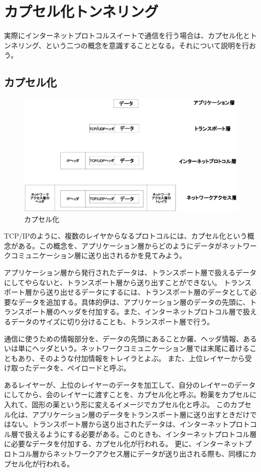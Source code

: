\section{カプセル化トンネリング}

実際にインターネットプロトコルスイートで通信を行う場合は、カプセル化とトンネリング、という二つの概念を意識することとなる。それについて説明を行おう。

\subsection{カプセル化}

\begin{figure}
	\includegraphics[width=12cm,clip]{draw/encupselation.eps}
	\caption{カプセル化}
	\label{fig:encupselation}
\end{figure}

TCP/IPのように、複数のレイヤからなるプロトコルには、カプセル化という概念がある。この概念を、アプリケーション層からどのようにデータがネットワークコミュニケーション層に送り出されるかを見てみよう。

アプリケーション層から発行されたデータは、トランスポート層で扱えるデータにしてやらないと、トランスポート層から送り出すことができない。
トランスポート層から送り出せるデータにするには、トランスポート層のデータとして必要なデータを追加する。具体的伊は、アプリケーション層のデータの先頭に、トランスポート層のヘッダを付加する。また、インターネットプロトコル層で扱えるデータのサイズに切り分けることも、トランスポート層で行う。

通信に使うための情報部分を、データの先頭にあることか羅、ヘッダ情報、あるいは単にヘッダという。ネットワークコミュニケーション層では末尾に着けることもあり、そのような付加情報をトレイラとよぶ。
また、上位レイヤーから受け取ったデータを、ペイロードと呼ぶ。

あるレイヤーが、上位のレイヤーのデータを加工して、自分のレイヤーのデータにしてから、会のレイヤーに渡すことを、カプセル化と呼ぶ。粉薬をカプセルに入れて、固形の薬という形に変えるイメージでカプセル化と呼ぶ。
このカプセル化は、アプリケーション層のデータをトランスポート層に送り出すときだけではない。トランスポート層から送り出されたデータは、インターネットプロトコル層で扱えるようにする必要がある。このときも、インターネットプロトコル層に必要なデータを付加する、カプセル化が行われる。
更に、インターネットプロトコル層からネットワークアクセス層にデータが送り出される際も、同様にカプセル化が行われる。

